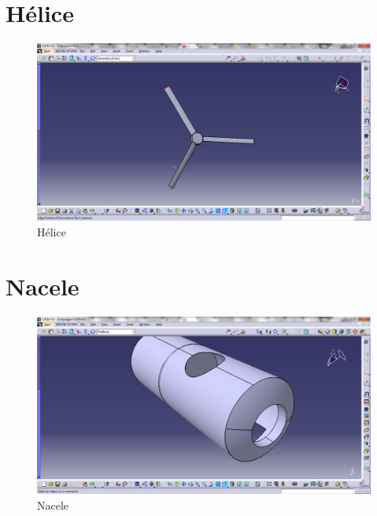 \section{Hélice}	
	\begin{figure}[!htbp]
	  \centering
	  \includegraphics[scale=0.45]{editaveis/figuras/C_helice}
	  \caption[Helice]{Hélice}
	  \label{Helice}
	\end{figure}
	\FloatBarrier

\section{Nacele}	
\begin{figure}[!htbp]
	  \centering
	  \includegraphics[scale=0.45]{editaveis/figuras/C_Nicele}
	  \caption[Nacele]{Nacele}
	  \label{Nacele}
	\end{figure}
	\FloatBarrier

